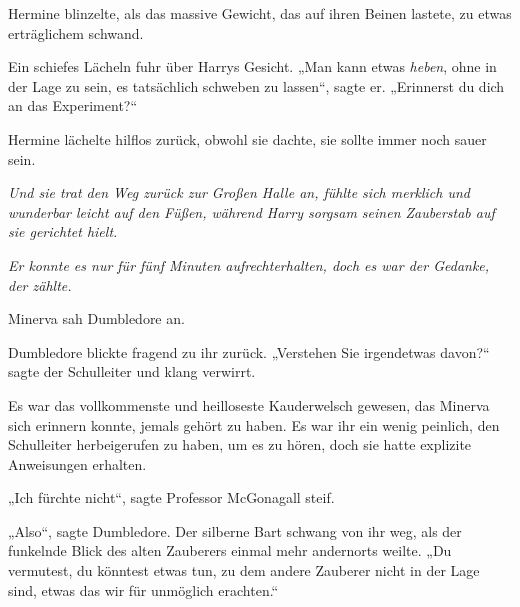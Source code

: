 Hermine blinzelte, als das massive Gewicht, das auf ihren Beinen lastete, zu etwas erträglichem schwand.

Ein schiefes Lächeln fuhr über Harrys Gesicht.
„Man kann etwas \emph{heben}, ohne in der Lage zu sein, es tatsächlich schweben zu lassen“, sagte er.
„Erinnerst du dich an das Experiment?“

Hermine lächelte hilflos zurück, obwohl sie dachte, sie sollte immer noch sauer sein.

\emph{Und sie trat den Weg zurück zur Großen Halle an, fühlte sich merklich und wunderbar leicht auf den Füßen, während Harry sorgsam seinen Zauberstab auf sie gerichtet hielt.}

\emph{Er konnte es nur für fünf Minuten aufrechterhalten, doch es war der Gedanke, der zählte.}

\later

Minerva sah Dumbledore an.

Dumbledore blickte fragend zu ihr zurück.
„Verstehen Sie irgendetwas davon?“ sagte der Schulleiter und klang verwirrt.

Es war das vollkommenste und heilloseste Kauderwelsch gewesen, das Minerva sich erinnern konnte, jemals gehört zu haben. Es war ihr ein wenig peinlich, den Schulleiter herbeigerufen zu haben, um es zu hören, doch sie hatte explizite Anweisungen erhalten.

„Ich fürchte nicht“, sagte Professor McGonagall steif.

„Also“, sagte Dumbledore. Der silberne Bart schwang von ihr weg, als der funkelnde Blick des alten Zauberers einmal mehr andernorts weilte.
„Du vermutest, du könntest etwas tun, zu dem andere Zauberer nicht in der Lage sind, etwas das wir für unmöglich erachten.“

